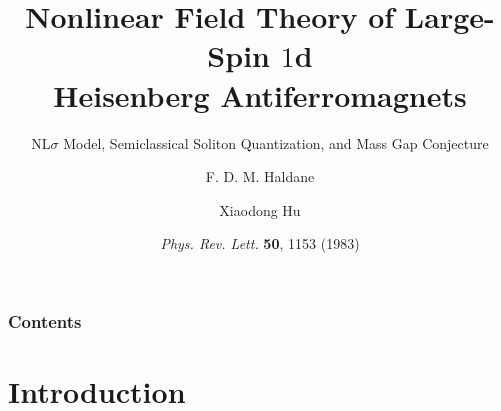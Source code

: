 \documentclass[10pt,aspectratio=43,xcolor=x11names,t]{beamer}%
\begin{document}
\title[Haldane's Conjecture]{Nonlinear Field Theory of Large-Spin $1$d\\Heisenberg Antiferromagnets}
\subtitle{NL$\sigma$ Model, Semiclassical Soliton Quantization, and Mass Gap Conjecture}
\author[Xiaodong Hu]{F. D. M. Haldane \and Xiaodong Hu}



\date{\color{red}\textit{Phys. Rev. Lett.} \textbf{50}, 1153 (1983)}


\begin{frame}%
	\titlepage
\end{frame}



\begin{frame}
	\frametitle{Contents}
	\tableofcontents
\end{frame}


\section{Introduction}
\end{document}
